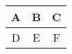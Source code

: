 \documentclass{article}
\begin{document}
\begin{tabular}{|c|c|c|}
\hline
A & B & C \\\hline
D & E & F \\\hline
\end{tabular}
\end{document}
